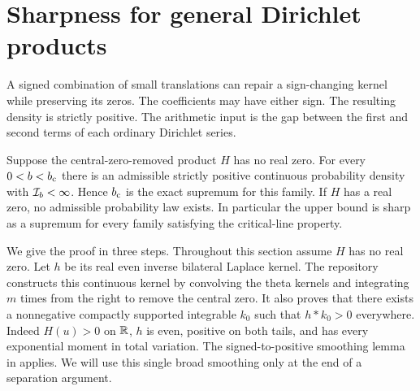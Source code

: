 \section{Sharpness for general Dirichlet products}\label{sec:general}

A signed combination of small translations can repair a sign-changing kernel while preserving its zeros. The coefficients may have either sign. The resulting density is strictly positive. The arithmetic input is the gap between the first and second terms of each ordinary Dirichlet series.

\begin{theorem}\label{thm:general}
Suppose the central-zero-removed product $H$ has no real zero. For every $0<b<b_{\mathrm c}$ there is an admissible strictly positive continuous probability density with $\mathcal I_b<\infty$. Hence $b_{\mathrm c}$ is the exact supremum for this family. If $H$ has a real zero, no admissible probability law exists. In particular the upper bound is sharp as a supremum for every family satisfying the critical-line property.
\end{theorem}

We give the proof in three steps. Throughout this section assume $H$ has no real zero. Let $h$ be its real even inverse bilateral Laplace kernel. The repository constructs this continuous kernel by convolving the theta kernels and integrating $m$ times from the right to remove the central zero. It also proves that there exists a nonnegative compactly supported integrable $k_0$ such that $h*k_0>0$ everywhere. Indeed $H(u)>0$ on $\mathbb R$, $h$ is even, positive on both tails, and has every exponential moment in total variation. The signed-to-positive smoothing lemma in \cite{proveit} applies. We will use this single broad smoothing only at the end of a separation argument.

